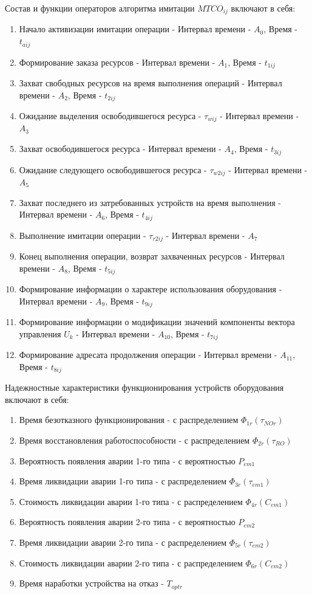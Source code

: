 Состав и функции операторов алгоритма имитации $MTCO_{ij}$ включают в себя:
\begin{enumerate}
    \item Начало активизации имитации операции - Интервал времени - $A_0$, Время - $t_{aij}$
    \item Формирование заказа ресурсов - Интервал времени - $A_1$, Время - $t_{1ij}$
    \item Захват свободных ресурсов на время выполнения операций - Интервал времени - $A_2$, Время - $t_{2ij}$
    \item Ожидание выделения освободившегося ресурса - $\tau_{wij}$ - Интервал времени - $A_3$
    \item Захват освободившегося ресурса - Интервал времени - $A_4$, Время - $t_{3ij}$
    \item Ожидание следующего освободившегося ресурса - $\tau_{w2ij}$ - Интервал времени - $A_5$
    \item Захват последнего из затребованных устройств на время выполнения - Интервал времени - $A_6$, Время - $t_{4ij}$
    \item Выполнение имитации операции - $\tau_{r2ij}$ - Интервал времени - $A_7$
    \item Конец выполнения операции, возврат захваченных ресурсов - Интервал времени - $A_8$, Время - $t_{5ij}$
    \item Формирование информации о характере использования оборудования - Интервал времени - $A_9$, Время - $t_{9ij}$
    \item Формирование информации о модификации значений компоненты вектора управления {$U_k$} - Интервал времени - $A_10$, Время - $t_{7ij}$
    \item Формирование адресата продолжения операции - Интервал времени - $A_11$, Время - $t_{8ij}$
\end{enumerate}

Надежностные характеристики функционирования устройств оборудования включают в себя:
\begin{enumerate}
    \item Время безотказного функционирования - с распределением $\Phi_{1r}(\tau_{NOr})$
    \item Время восстановления работоспособности  - с распределением $\Phi_{2r}(\tau_{RO})$
    \item Вероятность появления аварии 1-го типа - с вероятностью $P_{em1}$
    \item Время ликвидации аварии 1-го типа - с распределением $\Phi_{3r}(\tau_{em1})$
    \item Стоимость ликвидации аварии 1-го типа - с распределением $\Phi_{4r}(C_{em1})$
    \item Вероятность появления аварии 2-го типа - с вероятностью $P_{em2}$
    \item Время ликвидации аварии 2-го типа - с распределением $\Phi_{5r}(\tau_{em2})$
    \item Стоимость ликвидации аварии 2-го типа - с распределением $\Phi_{6r}(C_{em2})$
    \item Время наработки устройства на отказ - $T_{optr}$
\end{enumerate}

